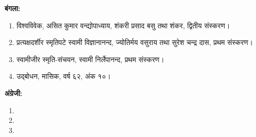 \centerline{\textbf{बंगला: }}

\begin{enumerate}
\item विश्वविवेक, असित कुमार वन्द्योपाध्याय, शंकरी प्रसाद बसु तथा शंकर, द्वितीय संस्करण। 

 \item प्रत्यक्षदर्शीर स्मृतिपटे स्वामी विज्ञानानन्द, ज्योतिर्मय वसुराय तथा सुरेश चन्द्र दास, प्रथम संस्करण। 

 \item स्वामीजीर स्मृति-संचयन, स्वामी निर्लेपानन्द, प्रथम संस्करण। 

 \item उद्बोधन, मासिक, वर्ष ६२, अंक १०। 

\end{enumerate}

\bgroup\renewcommand{}

\centerline{\textbf{अंग्रेजी:}}

\begin{enumerate}
\item {}

 \item {}

 \item {}

\end{enumerate}

\egroup

\delimiter

